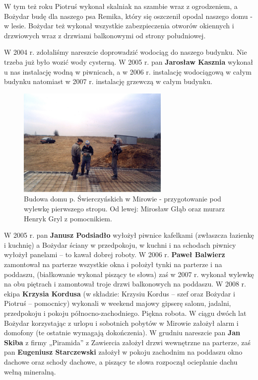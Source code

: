 W tym też roku Piotruś wykonał skalniak na szambie wraz z ogrodzeniem, a Bożydar budę dla naszego psa Remika, który się oszczenił opodal naszego domu -  w lesie. Bożydar też wykonał wszystkie zabezpieczenia otworów okiennych i drzwiowych wraz z drzwiami balkonowymi od strony południowej.

W 2004 r. zdołaliśmy nareszcie doprowadzić wodociąg do naszego budynku. Nie trzeba już było wozić wody cysterną. W 2005 r. pan \textbf{Jarosław Kasznia} wykonał u nas instalację wodną w piwnicach, a w 2006 r. instalację wodociągową w całym budynku natomiast w 2007 r. instalację grzewczą w całym budynku.

\begin{figure}[!h]
\begin{center}
\includegraphics[width=0.65\textwidth]{photo/mirow_budowa_1_strop.jpg}
\caption[Mirów, budowa domu Świerczyńskich]{Budowa domu p. Świerczyńskich w Mirowie - przygotowanie pod wylewkę pierwszego stropu. Od lewej: Mirosław Głąb oraz murarz Henryk Gryl z pomocnikiem.}
\end{center}
\end{figure}

W 2005 r. pan \textbf{Janusz Podsiadło} wyłożył piwnice kafelkami (zwłaszcza łazienkę i kuchnię) a Bożydar ściany w przedpokoju, w kuchni i na schodach piwnicy wyłożył panelami – to kawał dobrej roboty. W 2006 r. \textbf{Paweł Balwierz} zamontował na parterze wszystkie okna i położył tynki na parterze i na poddaszu, (białkowanie wykonał piszący te słowa) zaś w 2007 r. wykonał wylewkę na obu piętrach i zamontował troje drzwi balkonowych na poddaszu. W 2008 r. ekipa \textbf{Krzysia Kordusa} (w składzie: Krzysiu Kordus – szef oraz Bożydar i Piotruś – pomocnicy) wykonali w weekend majowy gipserę salonu, jadalni, przedpokoju i pokoju północno-zachodniego. Piękna robota. W ciągu dwóch lat Bożydar korzystając z urlopu i sobotnich pobytów w Mirowie założył alarm i domofony (te ostatnie wymagają dokończenia). W grudniu nareszcie pan \textbf{Jan Skiba} z firmy „Piramida” z Zawiercia założył drzwi wewnętrzne na parterze, zaś pan \textbf{Eugeniusz Starczewski} założył w pokoju zachodnim na poddaszu okno dachowe oraz schody dachowe, a piszący te słowa rozpoczął ocieplanie dachu wełną mineralną.

